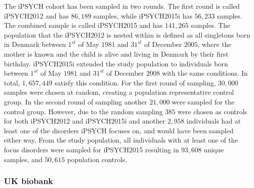 The iPSYCH cohort has been sampled in two rounds. The first round is called iPSYCH2012 and has $ 86,189 $ samples, while iPSYCH2015i has $ 56,233 $ samples. The combined sample is called iPSYCH2015 and has $ 141,265 $ samples. The population that the iPSYCH2012 is nested within is defined as all singletons born in Denmark between $ 1^{st} $ of May $ 1981 $ and $ 31^{st} $ of December $ 2005 $, where the mother is known and the child is alive and living in Denmark by their first birthday. iPSYCH2015i extended the study population to individuals born between $ 1^{st} $ of May $ 1981 $ and $ 31^{st} $ of December $ 2008 $ with the same conditions. In total, $ 1,657,449 $ satisfy this condition. For the first round of sampling, $ 30,000 $ samples were chosen at random, creating a population representative control group. In the second round of sampling another $ 21,000 $ were sampled for the control group. However, due to the random sampling $ 385 $ were chosen as controls for both iPSYCH2012 and iPSYCH2015i and another $ 2,958 $ individuals had at least one of the disorders iPSYCH focuses on, and would have been sampled either way. From the study population, all individuals with at least one of the focus disorders were sampled for iPSYCH2015 resulting in $ 93,608 $ unique samples, and $ 50,615 $ population controls. 

\subsubsection{UK biobank}


